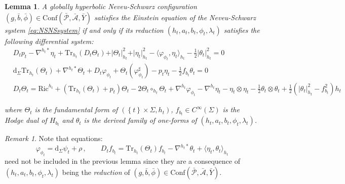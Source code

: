 \documentclass[10pt,reqno,a4paper]{amsart}
\theoremstyle{plain}
\newtheorem{lemma}[thm]{Lemma}
\theoremstyle{definition}
\theoremstyle{remark}
\newtheorem{remark}[thm]{Remark}
\theoremstyle{remark}
\def\dd{\mathrm{d}}
\def\Conf{\mathrm{Conf}}
\newcommand{\Tr}{\mathrm{Tr}}
\def\cA{\mathcal{A}}
\def\cP{\mathcal{P}}
\newcommand{\Ric}{\mathrm{Ric}}
\renewcommand{\(}{ (}
\renewcommand{\)}{ )}
\begin{document}
\begin{lemma}
\label{lemma:Einsteingh}
A globally hyperbolic Neveu-Schwarz configuration $(g,\bar{b},\bar{\phi})\in \Conf(\bar{\cP},\bar{\cA},\bar{Y})$ satisfies the Einstein equation of the Neveu-Schwarz system \eqref{eq:NSNSsystem} if and only if its reduction $( h_t , a_t , b_t , \phi_t,\lambda_t)$ satisfies the following differential system:
\begin{eqnarray*}
& D_tp_t  - \nabla^{h_t\ast}\eta_t + \Tr_{h_t}(D_t\Theta_t) + \vert \Theta_t \vert_{h_t}^2   + \vert\eta_t\vert_{h_t}^2 - \langle\varphi_{\phi_t},\eta_t\rangle_{h_t} - \frac{1}{2} \vert\theta_t\vert_{h_t}^2 = 0\\
& \dd_{\Sigma} \Tr_{h_t}(\Theta_t) + \nabla^{h_t\ast}\Theta_t + D_t\varphi_{\phi_t} +\Theta_t (\varphi_{\phi_t}^{\sharp}) -p_t\eta_t - \frac{1}{2}  f_{b_t} \theta_t  = 0\\
& D_t\Theta_t = \Ric^{h_t} + (\Tr_{h_t}(\Theta_t) + p_t) \Theta_t - 2 \Theta_t\circ_{h_t} \Theta_t + \nabla^{h_t} \varphi_{\phi_t} - \nabla^{h_t}\eta_t-\eta_t\otimes\eta_t  - \frac{1}{2} \theta_t \otimes \theta_t + \frac{1}{2} (\vert \theta_t\vert_{h_t}^2 - f_{b_t}^2) h_t   
\end{eqnarray*}

\noindent
where $\Theta_t$ is the fundamental form of $(\left\{ t\right\} \times \Sigma, h_t)$, $f_{b_t}\in C^{\infty}(\Sigma)$ is the Hodge dual of $H_{b_t}$ and $\theta_t$ is the derived family of one-forms of $( h_t , a_t , b_t , \phi_t,\lambda_t)$. 
\end{lemma}

\begin{remark}
Note that equations:
\begin{equation*}
\varphi_{\phi_t} = \dd_{\Sigma}\psi_t + \rho\, , \qquad D_t f_{b_t}=\Tr_{h_t}(\Theta_t)f_{b_t}-\nabla^{h_t\ast}\theta_t+\langle\eta_t,\theta_t\rangle_{h_t}
\end{equation*}
need not be included in the previous lemma since they are a consequence of $( h_t , a_t , b_t , \phi_t,\lambda_t)$ being the \emph{reduction} of $(g,\bar{b},\bar{\phi})\in \Conf(\bar{\cP},\bar{\cA},\bar{Y})$. 
\end{remark}
\end{document}
